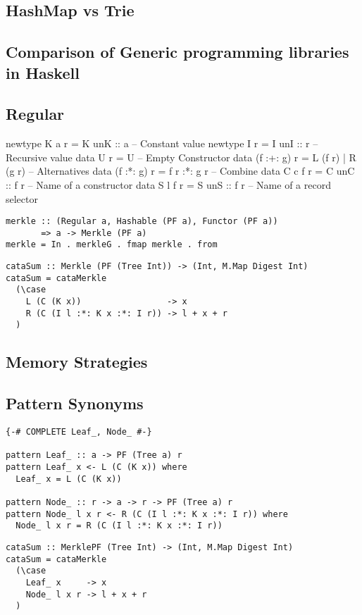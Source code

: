\subsection{HashMap vs Trie}

\subsection{Comparison of Generic programming libraries in Haskell}

\subsection{Regular}

\begin{haskell}
newtype K a r    = K { unK :: a}     -- Constant value
newtype I r      = I { unI :: r }    -- Recursive value
data U r         = U                 -- Empty Constructor
data (f :+: g) r = L (f r) | R (g r) -- Alternatives
data (f :*: g) r = f r :*: g r       -- Combine
data C c f r     = C { unC :: f r }  -- Name of a constructor
data S l f r     = S { unS :: f r }  -- Name of a record selector
\end{haskell}

\begin{verbatim}
merkle :: (Regular a, Hashable (PF a), Functor (PF a))
       => a -> Merkle (PF a)
merkle = In . merkleG . fmap merkle . from
\end{verbatim}

\begin{verbatim}
cataSum :: Merkle (PF (Tree Int)) -> (Int, M.Map Digest Int)
cataSum = cataMerkle
  (\case
    L (C (K x))                 -> x
    R (C (I l :*: K x :*: I r)) -> l + x + r
  )
\end{verbatim}

\subsection{Memory Strategies}

\subsection{Pattern Synonyms}
\begin{verbatim}
{-# COMPLETE Leaf_, Node_ #-}

pattern Leaf_ :: a -> PF (Tree a) r
pattern Leaf_ x <- L (C (K x)) where
  Leaf_ x = L (C (K x))

pattern Node_ :: r -> a -> r -> PF (Tree a) r
pattern Node_ l x r <- R (C (I l :*: K x :*: I r)) where
  Node_ l x r = R (C (I l :*: K x :*: I r))
\end{verbatim}

\begin{verbatim}
cataSum :: MerklePF (Tree Int) -> (Int, M.Map Digest Int)
cataSum = cataMerkle
  (\case
    Leaf_ x     -> x
    Node_ l x r -> l + x + r
  )
\end{verbatim}